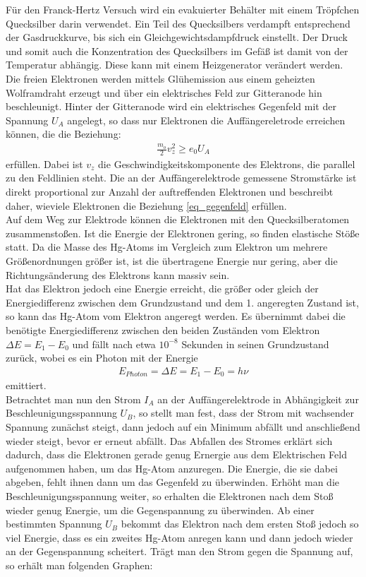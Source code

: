 Für den Franck-Hertz Versuch wird ein evakuierter Behälter mit einem Tröpfchen Quecksilber darin verwendet. Ein Teil des Quecksilbers verdampft  entsprechend der Gasdruckkurve, bis sich ein Gleichgewichtsdampfdruck einstellt. Der Druck und somit auch die Konzentration des Quecksilbers im Gefäß ist damit von der Temperatur abhängig. Diese kann mit einem Heizgenerator verändert werden.\\
Die freien Elektronen werden mittels Glühemission aus einem geheizten Wolframdraht erzeugt und über ein elektrisches Feld zur Gitteranode hin beschleunigt. Hinter der Gitteranode wird ein elektrisches Gegenfeld mit der Spannung $U_A$ angelegt, so dass nur Elektronen die Auffängereletrode erreichen können, die die Beziehung:
\begin{align}
\frac{m_o}{2} v^2_z \geq e_0 U_A
\label{eq_gegenfeld}
\end{align}
erfüllen. Dabei ist $v_z$ die Geschwindigkeitskomponente des Elektrons, die parallel zu den Feldlinien steht. Die an der Auffängerelektrode gemessene Stromstärke ist direkt proportional zur Anzahl der auftreffenden Elektronen und beschreibt daher, wieviele Elektronen die Beziehung \eqref{eq_gegenfeld} erfüllen.\\
Auf dem Weg zur Elektrode können die Elektronen mit den Quecksilberatomen zusammenstoßen. Ist die Energie der Elektronen gering, so finden elastische Stöße statt. Da die Masse des Hg-Atoms im Vergleich zum Elektron um mehrere Größenordnungen größer ist, ist die übertragene Energie nur gering, aber die Richtungsänderung des Elektrons kann massiv sein.\\
Hat das Elektron jedoch eine Energie erreicht, die größer oder gleich der Energiedifferenz zwischen dem Grundzustand und dem 1. angeregten Zustand
ist, so kann das Hg-Atom vom Elektron angeregt werden. Es übernimmt dabei die benötigte Energiedifferenz zwischen den beiden Zuständen vom Elektron $\Delta E=E_1-E_0$ und fällt nach etwa $10^{-8}$ Sekunden in seinen Grundzustand zurück, wobei es ein Photon mit der Energie 
\begin{align}
E_{Photon}=\Delta E = E_1-E_0 = h\nu
\label{eq_energie_phtoton}
\end{align}
emittiert.\\
Betrachtet man nun den Strom $I_A$ an der Auffängerelektrode in Abhängigkeit zur Beschleunigungsspannung $U_B$, so stellt man fest, dass der Strom mit wachsender Spannung zunächst steigt, dann jedoch auf ein Minimum abfällt und anschließend wieder steigt, bevor er erneut abfällt. Das Abfallen des Stromes erklärt sich dadurch, dass die Elektronen gerade genug Ernergie aus dem Elektrischen Feld aufgenommen haben, um das Hg-Atom anzuregen. Die Energie, die sie dabei abgeben, fehlt ihnen dann um das Gegenfeld zu überwinden. Erhöht man die Beschleunigungsspannung weiter, so erhalten die Elektronen nach dem Stoß wieder genug Energie, um die Gegenspannung zu überwinden. Ab einer bestimmten Spannung $U_B$ bekommt das Elektron nach dem ersten Stoß jedoch so viel Energie, dass es ein zweites Hg-Atom anregen kann und dann jedoch wieder an der Gegenspannung scheitert. Trägt man den Strom gegen die Spannung auf, so erhält man folgenden Graphen:
